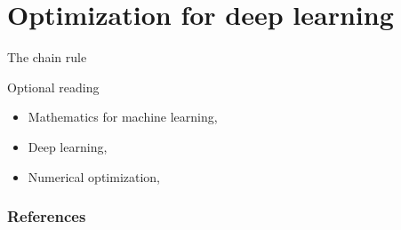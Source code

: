 \documentclass[notes]{beamer}
\begin{document}
    \section{Optimization for deep learning}
    \begin{frame}{The chain rule}
    \end{frame}


    \begin{frame}[allowframebreaks]{Optional reading}
      \begin{itemize}
        \item Mathematics for machine learning, \cite[Chapter 5, Vector Calculus]{deisenroth2020mathematics}
        \item Deep learning, \cite[Chapter 8.2, Automatic Differentiation]{wright1999numerical}
        \item Numerical optimization, \cite[Chapter 8, Optimization for Training Deep Models]{goodfellow2016deep}
      \end{itemize}
    \end{frame}

    \begin{frame}
      \frametitle{References}
      \renewcommand*{\bibfont}{\scriptsize}
      \printbibliography
  \end{frame}
\end{document}
